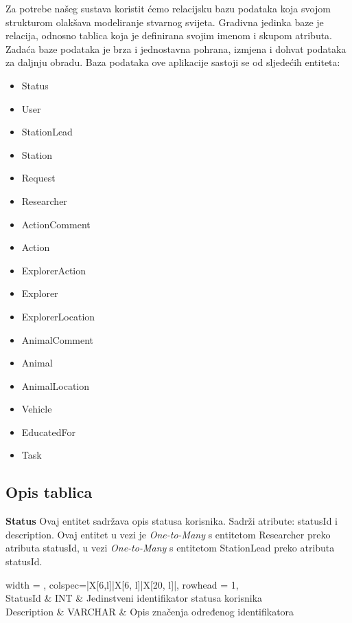 		Za potrebe našeg sustava koristit ćemo relacijsku bazu podataka koja svojom strukturom olakšava modeliranje stvarnog svijeta. Gradivna jedinka baze je relacija, odnosno tablica koja je definirana svojim imenom i skupom atributa. Zadaća baze podataka je brza i jednostavna pohrana, izmjena i dohvat podataka za daljnju obradu.
		Baza podataka ove aplikacije sastoji se od sljedećih entiteta:
		\begin{itemize}
			\item Status
			\item User
			\item StationLead
			\item Station
			\item Request
			\item Researcher
			\item ActionComment
			\item Action
			\item ExplorerAction
			\item Explorer
			\item ExplorerLocation
			\item AnimalComment
			\item Animal
			\item AnimalLocation
			\item Vehicle
			\item EducatedFor
			\item Task
		\end{itemize}
		
			\subsection{Opis tablica}
				
				\textbf{Status} Ovaj entitet sadržava opis statusa korisnika. Sadrži atribute: statusId i description. Ovaj entitet u vezi je \textit{One-to-Many} s entitetom Researcher preko atributa statusId, u vezi \textit{One-to-Many} s entitetom StationLead preko atributa statusId.
				\begin{longtblr}[
					label=none,
					entry=none
					]{
						width = \textwidth,
						colspec={|X[6,l]|X[6, l]|X[20, l]|}, 
						rowhead = 1,
					} %
					\hline {}	 \\ \hline[3pt]
					StatusId & INT	&  	Jedinstveni identifikator statusa korisnika	\\ \hline
					Description	& VARCHAR &   Opis značenja određenog identifikatora	\\ \hline
				\end{longtblr}
				
